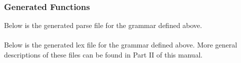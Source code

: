 \subsubsection{Generated Functions}
Below is the generated parse file for the grammar defined above.\\
\ \\
%
Below is the generated lex file for the grammar defined above. More general 
descriptions of these files can be found in Part II of this manual. \\
